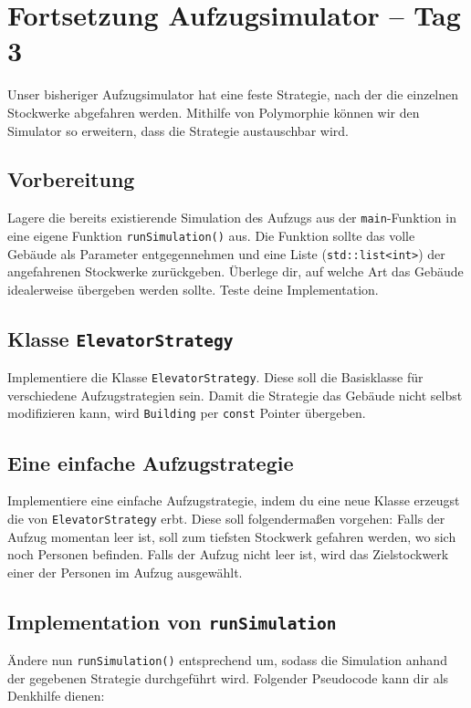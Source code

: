 \section{Fortsetzung Aufzugsimulator -- Tag 3}
Unser bisheriger Aufzugsimulator hat eine feste Strategie, nach der die einzelnen Stockwerke abgefahren werden.
Mithilfe von Polymorphie können wir den Simulator so erweitern, dass die Strategie austauschbar wird.  

\subsection{Vorbereitung}
Lagere die bereits existierende Simulation des Aufzugs aus der \lstinline{main}-Funktion in eine eigene Funktion \lstinline{runSimulation()} aus.
Die Funktion sollte das volle Gebäude als Parameter entgegennehmen und eine Liste (\lstinline{std::list<int>}) der angefahrenen Stockwerke zurückgeben.
Überlege dir, auf welche Art das Gebäude idealerweise übergeben werden sollte.
Teste deine Implementation.

\subsection{Klasse \lstinline{ElevatorStrategy}}
Implementiere die Klasse \lstinline{ElevatorStrategy}.
Diese soll die Basisklasse für verschiedene Aufzugstrategien sein.
Damit die Strategie das Gebäude nicht selbst modifizieren kann, wird \lstinline{Building} per \lstinline{const} Pointer übergeben.



\subsection{Eine einfache Aufzugstrategie}
Implementiere eine einfache Aufzugstrategie, indem du eine neue Klasse erzeugst die von \lstinline{ElevatorStrategy} erbt.
Diese soll folgendermaßen vorgehen: 
Falls der Aufzug momentan leer ist, soll zum tiefsten Stockwerk gefahren werden, wo sich noch Personen befinden.
Falls der Aufzug nicht leer ist, wird das Zielstockwerk einer der Personen im Aufzug ausgewählt.

\subsection{Implementation von \lstinline{runSimulation}}
Ändere nun \lstinline{runSimulation()} entsprechend um, sodass die Simulation anhand der gegebenen Strategie durchgeführt wird.
Folgender Pseudocode kann dir als Denkhilfe dienen:

